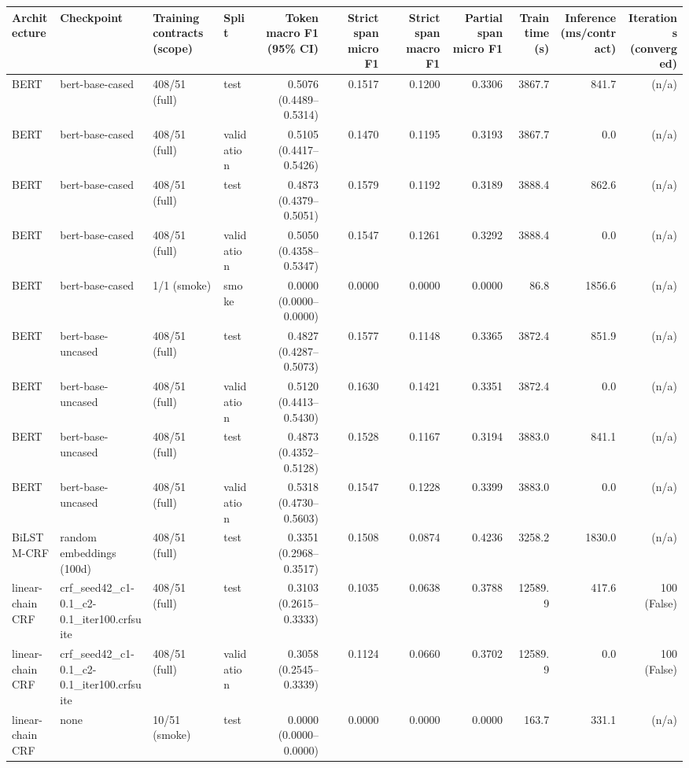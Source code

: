 \begin{tabular}{llllrrrrrrr}
\toprule
Architecture & Checkpoint & Training contracts (scope) & Split & Token macro F1 (95\% CI) & Strict span micro F1 & Strict span macro F1 & Partial span micro F1 & Train time (s) & Inference (ms/contract) & Iterations (converged) \\
\midrule
BERT & bert-base-cased & 408/51 (full) & test & 0.5076 (0.4489--0.5314) & 0.1517 & 0.1200 & 0.3306 & 3867.7 & 841.7 &  (n/a) \\
BERT & bert-base-cased & 408/51 (full) & validation & 0.5105 (0.4417--0.5426) & 0.1470 & 0.1195 & 0.3193 & 3867.7 & 0.0 &  (n/a) \\
BERT & bert-base-cased & 408/51 (full) & test & 0.4873 (0.4379--0.5051) & 0.1579 & 0.1192 & 0.3189 & 3888.4 & 862.6 &  (n/a) \\
BERT & bert-base-cased & 408/51 (full) & validation & 0.5050 (0.4358--0.5347) & 0.1547 & 0.1261 & 0.3292 & 3888.4 & 0.0 &  (n/a) \\
BERT & bert-base-cased & 1/1 (smoke) & smoke & 0.0000 (0.0000--0.0000) & 0.0000 & 0.0000 & 0.0000 & 86.8 & 1856.6 &  (n/a) \\
BERT & bert-base-uncased & 408/51 (full) & test & 0.4827 (0.4287--0.5073) & 0.1577 & 0.1148 & 0.3365 & 3872.4 & 851.9 &  (n/a) \\
BERT & bert-base-uncased & 408/51 (full) & validation & 0.5120 (0.4413--0.5430) & 0.1630 & 0.1421 & 0.3351 & 3872.4 & 0.0 &  (n/a) \\
BERT & bert-base-uncased & 408/51 (full) & test & 0.4873 (0.4352--0.5128) & 0.1528 & 0.1167 & 0.3194 & 3883.0 & 841.1 &  (n/a) \\
BERT & bert-base-uncased & 408/51 (full) & validation & 0.5318 (0.4730--0.5603) & 0.1547 & 0.1228 & 0.3399 & 3883.0 & 0.0 &  (n/a) \\
BiLSTM-CRF & random embeddings (100d) & 408/51 (full) & test & 0.3351 (0.2968--0.3517) & 0.1508 & 0.0874 & 0.4236 & 3258.2 & 1830.0 &  (n/a) \\
linear-chain CRF & crf_seed42_c1-0.1_c2-0.1_iter100.crfsuite & 408/51 (full) & test & 0.3103 (0.2615--0.3333) & 0.1035 & 0.0638 & 0.3788 & 12589.9 & 417.6 & 100 (False) \\
linear-chain CRF & crf_seed42_c1-0.1_c2-0.1_iter100.crfsuite & 408/51 (full) & validation & 0.3058 (0.2545--0.3339) & 0.1124 & 0.0660 & 0.3702 & 12589.9 & 0.0 & 100 (False) \\
linear-chain CRF & none & 10/51 (smoke) & test & 0.0000 (0.0000--0.0000) & 0.0000 & 0.0000 & 0.0000 & 163.7 & 331.1 &  (n/a) \\

\end{tabular}
